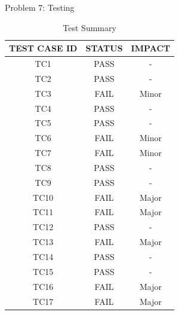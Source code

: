 \documentclass[a4paper,12pt]{article}
\begin{document}
\begin{section}{Problem 7: Testing}
\begin{table}[htp]
	\centering
	\caption{Test Summary} \vspace{0.5cm} \label{tab:difficulty_table} 
	\begin{tabular}{||c|c|c||}
		\hline  \hline \textbf{TEST CASE ID} & \textbf{STATUS} & \textbf{IMPACT} \\
		\hline \hline
		TC1 & PASS & - \\ 
		\hline
		TC2 & PASS & - \\ 
		\hline
		TC3 & FAIL & Minor \\ 
		\hline
		TC4 & PASS & - \\ 
		\hline
		TC5 & PASS & - \\ 
		\hline
		TC6 & FAIL & Minor \\ 
		\hline
		TC7 & FAIL & Minor \\ 
		\hline
		TC8 & PASS & - \\ 
		\hline
		TC9 & PASS & - \\ 
		\hline
		TC10 & FAIL & Major \\ 
		\hline
		TC11 & FAIL & Major \\ 
		\hline
		TC12 & PASS & - \\ 
		\hline
		TC13 & FAIL & Major \\ 
		\hline
		TC14 & PASS & - \\ 
		\hline
		TC15 & PASS & - \\ 
		\hline
		TC16 & FAIL & Major \\ 
		\hline
		TC17 & FAIL & Major \\ 
		\hline	
	\end{tabular}
\end{table}



\end{section}
\end{document}
